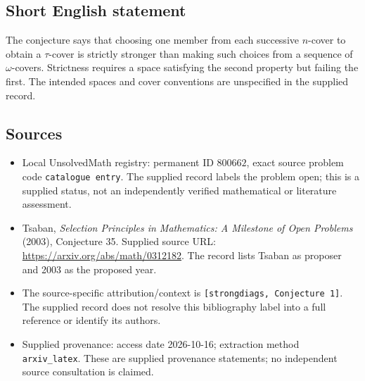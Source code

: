 \documentclass[11pt]{article}
\begin{document}
\subsection{Short English statement}
The conjecture says that choosing one member from each successive \(n\)-cover to obtain a \(\tau\)-cover is strictly stronger than making such choices from a sequence of \(\omega\)-covers. Strictness requires a space satisfying the second property but failing the first. The intended spaces and cover conventions are unspecified in the supplied record.
\subsection{Sources}
\begin{itemize}
\item Local UnsolvedMath registry: permanent ID \(800662\), exact source problem code \texttt{catalogue entry}. The supplied record labels the problem open; this is a supplied status, not an independently verified mathematical or literature assessment.
\item Tsaban, \emph{Selection Principles in Mathematics: A Milestone of Open Problems} (2003), Conjecture 35. Supplied source URL: \url{https://arxiv.org/abs/math/0312182}. The record lists Tsaban as proposer and 2003 as the proposed year.
\item The source-specific attribution/context is \texttt{[strongdiags, Conjecture 1]}. The supplied record does not resolve this bibliography label into a full reference or identify its authors.
\item Supplied provenance: access date 2026-10-16; extraction method \texttt{arxiv\_latex}. These are supplied provenance statements; no independent source consultation is claimed.
\end{itemize}
\end{document}
